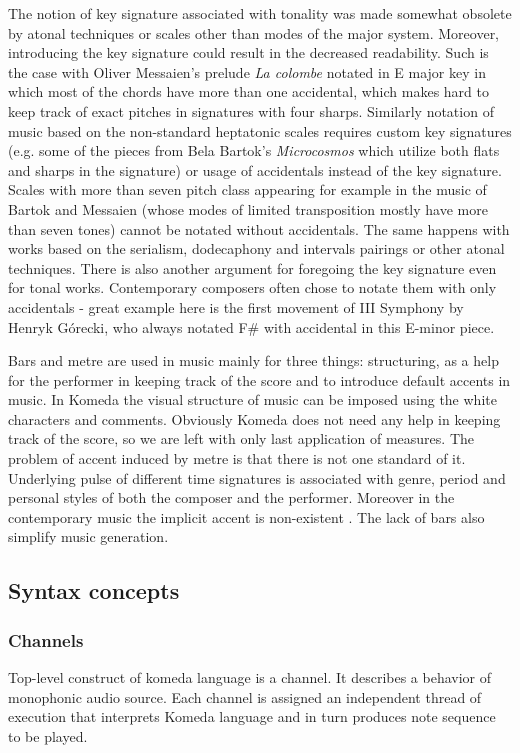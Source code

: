 \documentclass{article}
\begin{document}
The notion of key signature associated with tonality was made somewhat obsolete
by atonal techniques or scales other than modes of the major system.  Moreover,
introducing the key signature could result in the decreased readability. Such
is the case with Oliver Messaien's prelude {\it La colombe} notated in E major
key in which most of the chords have more than one accidental, which makes hard
to keep track of exact pitches in signatures with four sharps.  Similarly
notation of music based on the non-standard heptatonic scales requires custom
key signatures (e.g. some of the pieces from Bela Bartok's {\it Microcosmos}
which utilize both flats and sharps in the signature) or usage of accidentals
instead of the key signature.  Scales with more than seven pitch class
appearing for example  in the music of Bartok \cite{bela1} \cite{bela2} and
Messaien (whose modes of limited transposition \cite{mess} mostly have more
than seven tones) cannot be notated without accidentals. The same happens with
works based on the serialism, dodecaphony and intervals pairings \cite{lutos}
or other atonal techniques. There is also another argument for foregoing the
key signature even for tonal works. Contemporary composers often chose to
notate them with only accidentals - great example here is the first movement of
III Symphony by Henryk G\'{o}recki, who always notated F\# with accidental in
this E-minor piece.

Bars and metre are used in music mainly for three things: structuring, as a
help for the performer in keeping track of the score and to introduce default
accents in music. In Komeda the visual structure of music can be imposed using
the white characters and comments. Obviously Komeda does not need any help in
keeping track of the score, so we are left with only last application of
measures. The problem of accent induced by metre is that there is not one
standard of it. Underlying pulse of different time signatures is associated
with genre, period and personal styles of both the composer and the performer.
Moreover in the contemporary music the implicit accent is non-existent
\cite{harm}. The lack of bars also simplify music generation.

\subsection{Syntax concepts}
\label{lang:concepts}

\subsubsection{Channels}
Top-level construct of komeda language is a channel.  It describes a behavior
of monophonic audio source.  Each channel is assigned an independent thread of
execution that interprets Komeda language and in turn produces note sequence to
be played. 
\end{document}
